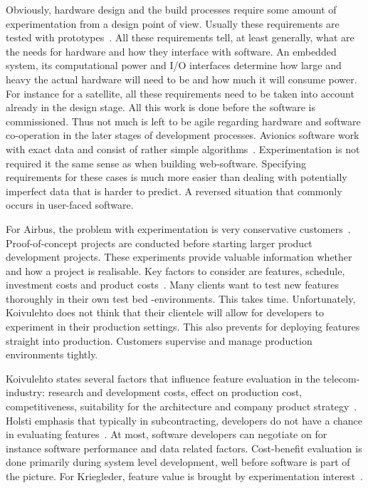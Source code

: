 \documentclass[english]{tktltiki2}
\begin{document}
Obviously, hardware design and the build processes require some amount of experimentation from a design point of view. Usually these requirements are tested with prototypes~\cite{Hol15b}. All these requirements tell, at least generally, what are the needs for hardware and how they interface with software. An embedded system, its computational power and I/O interfaces determine how large and heavy the actual hardware will need to be and how much it will consume power. For instance for a satellite, all these requirements need to be taken into account already in the design stage. All this work is done before the software is commissioned. Thus not much is left to be agile regarding hardware and software co-operation in the later stages of development processes. Avionics software work with exact data and consist of rather simple algorithms~\cite{Hol15b}. Experimentation is not required it the same sense as when building web-software. Specifying requirements for these cases is much more easier than dealing with potentially imperfect data that is harder to predict. A reversed situation that commonly occurs in user-faced software.

For Airbus, the problem with experimentation is very conservative customers~\cite{Koi15}. Proof-of-concept projects are conducted before starting larger product development projects. These experiments provide valuable information whether and how a project is realisable. Key factors to consider are features, schedule, investment costs and product costs~\cite{Koi15}. Many clients want to test new features thoroughly in their own test bed -environments. This takes time. Unfortunately, Koivulehto does not think that their clientele will allow for developers to experiment in their production settings. This also prevents for deploying features straight into production. Customers supervise and manage production environments tightly.

Koivulehto states several factors that influence feature evaluation in the telecom-industry: research and development costs, effect on production cost, competitiveness, suitability for the architecture and company product strategy~\cite{Koi15}. Holsti emphasis that typically in subcontracting, developers do not have a chance in evaluating features~\cite{Hol15b}. At most, software developers can negotiate on for instance software performance and data related factors. Cost-benefit evaluation is done primarily during system level development, well before software is part of the picture. For Kriegleder, feature value is brought by experimentation interest~\cite{Kri15}.
\end{document}
